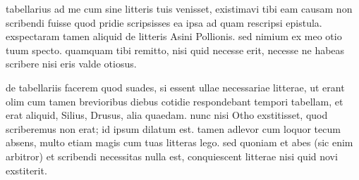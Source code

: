 


 tabellarius ad me cum sine litteris tuis venisset, existimavi tibi eam causam non scribendi fuisse quod pridie scripsisses ea ipsa ad quam rescripsi epistula. exspectaram tamen aliquid de litteris Asini Pollionis. sed nimium ex meo otio tuum specto. quamquam tibi remitto, nisi quid necesse erit, necesse ne habeas scribere nisi eris valde otiosus.

 de tabellariis facerem quod suades, si essent ullae necessariae litterae, ut erant olim cum tamen brevioribus diebus cotidie respondebant tempori tabellam, et erat aliquid, Silius, Drusus, alia quaedam. nunc nisi Otho exstitisset, quod scriberemus non erat; id ipsum dilatum est. tamen adlevor cum loquor tecum absens, multo etiam magis cum tuas litteras lego. sed quoniam et abes (sic enim arbitror) et scribendi necessitas nulla est, conquiescent litterae nisi quid novi exstiterit.
